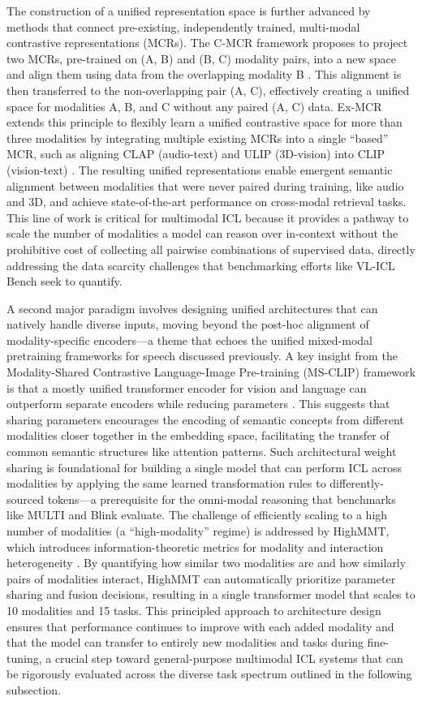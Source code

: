 \documentclass[11pt]{article}
\begin{document}
The construction of a unified representation space is further advanced by methods that connect pre-existing, independently trained, multi-modal contrastive representations (MCRs). The C-MCR framework proposes to project two MCRs, pre-trained on (A, B) and (B, C) modality pairs, into a new space and align them using data from the overlapping modality B \cite{ref293}. This alignment is then transferred to the non-overlapping pair (A, C), effectively creating a unified space for modalities A, B, and C without any paired (A, C) data. Ex-MCR extends this principle to flexibly learn a unified contrastive space for more than three modalities by integrating multiple existing MCRs into a single ``based'' MCR, such as aligning CLAP (audio-text) and ULIP (3D-vision) into CLIP (vision-text) \cite{ref294}. The resulting unified representations enable emergent semantic alignment between modalities that were never paired during training, like audio and 3D, and achieve state-of-the-art performance on cross-modal retrieval tasks. This line of work is critical for multimodal ICL because it provides a pathway to scale the number of modalities a model can reason over in-context without the prohibitive cost of collecting all pairwise combinations of supervised data, directly addressing the data scarcity challenges that benchmarking efforts like VL-ICL Bench seek to quantify.

A second major paradigm involves designing unified architectures that can natively handle diverse inputs, moving beyond the post-hoc alignment of modality-specific encoders---a theme that echoes the unified mixed-modal pretraining frameworks for speech discussed previously. A key insight from the Modality-Shared Contrastive Language-Image Pre-training (MS-CLIP) framework is that a mostly unified transformer encoder for vision and language can outperform separate encoders while reducing parameters \cite{ref295}. This suggests that sharing parameters encourages the encoding of semantic concepts from different modalities closer together in the embedding space, facilitating the transfer of common semantic structures like attention patterns. Such architectural weight sharing is foundational for building a single model that can perform ICL across modalities by applying the same learned transformation rules to differently-sourced tokens---a prerequisite for the omni-modal reasoning that benchmarks like MULTI and Blink evaluate. The challenge of efficiently scaling to a high number of modalities (a ``high-modality'' regime) is addressed by HighMMT, which introduces information-theoretic metrics for modality and interaction heterogeneity \cite{ref227}. By quantifying how similar two modalities are and how similarly pairs of modalities interact, HighMMT can automatically prioritize parameter sharing and fusion decisions, resulting in a single transformer model that scales to 10 modalities and 15 tasks. This principled approach to architecture design ensures that performance continues to improve with each added modality and that the model can transfer to entirely new modalities and tasks during fine-tuning, a crucial step toward general-purpose multimodal ICL systems that can be rigorously evaluated across the diverse task spectrum outlined in the following subsection.
\end{document}
